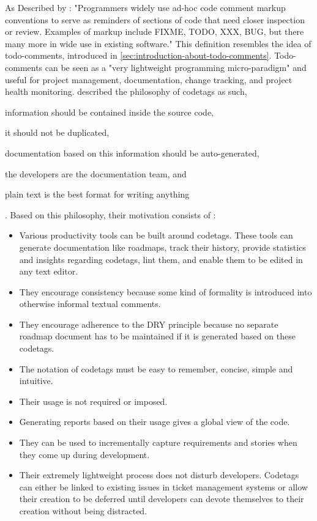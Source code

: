 As Described by \citeauthor{elliott_pep_2005} \cite{elliott_pep_2005}: "Programmers widely use ad-hoc code comment markup conventions to serve as reminders of sections of code that need closer inspection or review. Examples of markup include FIXME, TODO, XXX, BUG, but there many more in wide use in existing software."
This definition resembles the idea of todo-comments, introduced in \ref{sec:introduction-about-todo-comments}.
Todo-comments can be seen as a "very lightweight programming micro-paradigm" \cite{elliott_pep_2005} and useful for project management, documentation, change tracking, and project health monitoring.
\cite{elliott_pep_2005} described the philosophy of codetags as such,
\begin{enumerate*}[label=(\roman*)]
\item information should be contained inside the source code,
\item it should not be duplicated,
\item documentation based on this information should be auto-generated,
\item the developers are the documentation team, and
\item plain text is the best format for writing anything
\end{enumerate*}.
Based on this philosophy, their motivation consists of \cite{elliott_pep_2005}:
\begin{itemize}
  \item Various productivity tools can be built around codetags. These tools can generate documentation like roadmaps, track their history, provide statistics and insights regarding codetags, lint them, and enable them to be edited in any text editor.
  \item They encourage consistency because some kind of formality is introduced into otherwise informal textual comments.
  \item They encourage adherence to the DRY principle because no separate roadmap document has to be maintained if it is generated based on these codetags.
  \item The notation of codetags must be easy to remember, concise, simple and intuitive.
  \item Their usage is not required or imposed.
  \item Generating reports based on their usage gives a global view of the code.
  \item They can be used to incrementally capture requirements and stories when they come up during development.
  \item Their extremely lightweight process does not disturb developers. Codetags can either be linked to existing issues in ticket management systems or allow their creation to be deferred until developers can devote themselves to their creation without being distracted.
\end{itemize}

